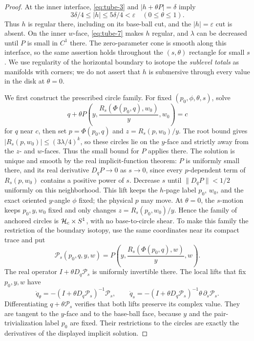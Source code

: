\begin{proof}
At the inner interface, \eqref{eq:tube-3} and \(|h+\theta P|=\delta\) imply
\begin{equation}
3\delta/4\le |h|\le5\delta/4<\varepsilon
\quad(0\le\theta\le1).
\label{eq:tube-7}
\end{equation}
Thus \(h\) is regular there, including on its base-ball cut, and
the \(|h|=\varepsilon\) cut is absent. On the inner \(w\)-face,
\eqref{eq:tube-7} makes \(h\) regular, and \(\lambda\) can be
decreased until \(P\) is small in \(C^1\) there.
The zero-parameter cone is
smooth along this interface, so the same assertion holds throughout
the \((s,\theta)\) rectangle for small \(s\). We use regularity
of the horizontal boundary to isotope the \emph{sublevel totals}
as manifolds with corners; we do not assert that \(h\) is submersive
through every value in the disk at \(\theta=0\).

We first construct the prescribed circle family. For fixed
\((p_0,\phi,\theta,s)\), solve
\[
q+\theta P\left(y,\frac{R_s(\Phi(p_0,q),w_0)}y,w_0\right)=c
\]
for \(q\) near \(c\), then set
\(p=\Phi(p_0,q)\) and \(z=R_s(p,w_0)/y\).
The root bound gives
\(\lvert R_s(p,w_0)\rvert\le(3\lambda/4)^k\), so these circles
lie on the \(y\)-face and strictly away from the \(z\)- and
\(w\)-faces. Thus the small bound for \(P\) applies there.
The solution is unique and smooth by the real implicit-function
theorem: \(P\) is uniformly small there, and its real derivative
\(D_qP\to0\) as \(s\to0\), since every
\(p\)-dependent term of \(R_s(p,w_0)\) contains a positive
power of \(s\). Decrease \(s\) until \(\lVert D_qP\rVert<1/2\)
uniformly on this neighborhood. This lift keeps the \(h\)-page label \(p_0\),
\(w_0\), and the exact oriented \(y\)-angle \(\phi\) fixed;
the physical \(p\) may move. At \(\theta=0\), the \(s\)-motion
keeps \(p_0,y,w_0\) fixed and only changes
\(z=R_s(p_0,w_0)/y\). Hence the family of anchored
circles is \(\mathcal H_c\times S^1\), with no base-to-circle shear.
To make this family the restriction of the boundary isotopy, use
the same coordinates near its compact trace and put
\[
 \mathcal P_s(p_0,q,y,w)
 =P\left(y,\frac{R_s(\Phi(p_0,q),w)}{y},w\right).
\]
The real operator \(I+\theta D_q\mathcal P_s\) is uniformly
invertible there. The local lifts that fix \(p_0,y,w\) have
\[
 \dot q_\theta=-(I+\theta D_q\mathcal P_s)^{-1}\mathcal P_s,
 \qquad
 \dot q_s=-(I+\theta D_q\mathcal P_s)^{-1}
                  \theta\,\partial_s\mathcal P_s.
\]
Differentiating \(q+\theta\mathcal P_s\) verifies that both lifts
preserve its complex value. They are tangent to the \(y\)-face
and to the base-ball face, because \(y\) and the pair-trivialization
label \(p_0\) are fixed. Their restrictions to the circles are
exactly the derivatives of the displayed implicit solution.


\end{proof}
